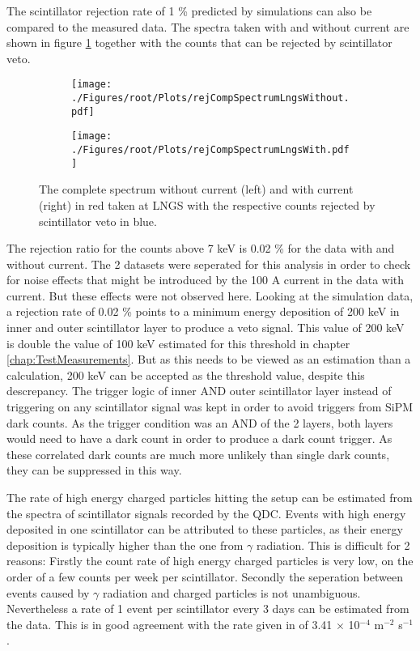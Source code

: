 The scintillator rejection rate of 1 \% predicted by simulations can also be compared to the measured data. The spectra taken with and without current are shown in figure \ref{fig:rejSpecLngs} together with the counts that can be rejected by scintillator veto.
\begin{figure}[h]
 \centering
 \begin{subfigure}{.49\textwidth}
 \centering
 \texttt{[image: ./Figures/root/Plots/rejCompSpectrumLngsWithout.pdf]}
 \end{subfigure}
 \hfill
 \begin{subfigure}{.49\textwidth}
 \centering
 \texttt{[image: ./Figures/root/Plots/rejCompSpectrumLngsWith.pdf]}
 \end{subfigure}
 \caption{The complete spectrum without current (left) and with current (right) in red taken at LNGS with the respective counts rejected by scintillator veto in blue.}
 \label{fig:rejSpecLngs}
\end{figure}
The rejection ratio for the counts above 7 keV is 0.02 \% for the data with and without current. The 2 datasets were seperated for this analysis in order to check for noise effects that might be introduced by the 100 A current in the data with current. But these effects were not observed here. Looking at the simulation data, a rejection rate of 0.02 \% points to a minimum energy deposition of 200 keV in inner and outer scintillator layer to produce a veto signal. This value of 200 keV is double the value of 100 keV estimated for this threshold in chapter \ref{chap:TestMeasurements}. But as this needs to be viewed as an estimation than a calculation, 200 keV can be accepted as the threshold value, despite this descrepancy. The trigger logic of inner AND outer scintillator layer instead of triggering on any scintillator signal was kept in order to avoid triggers from SiPM dark counts. As the trigger condition was an AND of the 2 layers, both layers would need to have a dark count in order to produce a dark count trigger. As these correlated dark counts are much more unlikely than single dark counts, they can be suppressed in this way. 

The rate of high energy charged particles hitting the setup can be estimated from the spectra of scintillator signals recorded by the QDC. Events with high energy deposited in one scintillator can be attributed to these particles, as their energy deposition is typically higher than the one from $\gamma$ radiation. This is difficult for 2 reasons: Firstly the count rate of high energy charged particles is very low, on the order of a few counts per week per scintillator. Secondly the seperation between events caused by $\gamma$ radiation and charged particles is not unambiguous. Nevertheless a rate of 1 event per scintillator every 3 days can be estimated from the data. This is in good agreement with the rate given in \cite{Bellini2013} of 3.41 $\times$ 10$^{-4}$ m$^{-2}$ s$^{-1}$.

